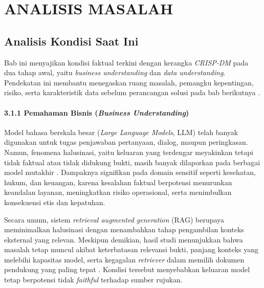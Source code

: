 
\chapter{ANALISIS MASALAH}
\label{chap:analisis-masalah}

\section{Analisis Kondisi Saat Ini}
\label{sec:analisis-kondisi-saat-ini}

Bab ini menyajikan kondisi faktual terkini dengan kerangka \textit{CRISP-DM} pada dua tahap awal, yaitu \textit{business understanding} dan \textit{data understanding}. Pendekatan ini membantu menegaskan ruang masalah, pemangku kepentingan, risiko, serta karakteristik data sebelum perancangan solusi pada bab berikutnya \parencite{wirth2000crispdm,studer2021crispmlq}.

\subsubsection*{3.1.1 Pemahaman Bisnis (\textit{Business Understanding})}

Model bahasa berskala besar (\textit{Large Language Models}, LLM) telah banyak digunakan untuk tugas penjawaban pertanyaan, dialog, maupun peringkasan. Namun, fenomena halusinasi, yaitu keluaran yang terdengar meyakinkan tetapi tidak faktual atau tidak didukung bukti, masih banyak dilaporkan pada berbagai model mutakhir \parencite{zhao2023survey,math2024hallucination}. Dampaknya signifikan pada domain sensitif seperti kesehatan, hukum, dan keuangan, karena kesalahan faktual berpotensi menurunkan keandalan layanan, meningkatkan risiko operasional, serta menimbulkan konsekuensi etis dan kepatuhan.

Secara umum, sistem \textit{retrieval augmented generation} (RAG) berupaya meminimalkan halusinasi dengan menambahkan tahap pengambilan konteks eksternal yang relevan. Meskipun demikian, hasil studi menunjukkan bahwa masalah tetap muncul akibat keterbatasan relevansi bukti, panjang konteks yang melebihi kapasitas model, serta kegagalan \textit{retriever} dalam memilih dokumen pendukung yang paling tepat \parencite{shuster2021retrieval}. Kondisi tersebut menyebabkan keluaran model tetap berpotensi tidak \textit{faithful} terhadap sumber rujukan.

